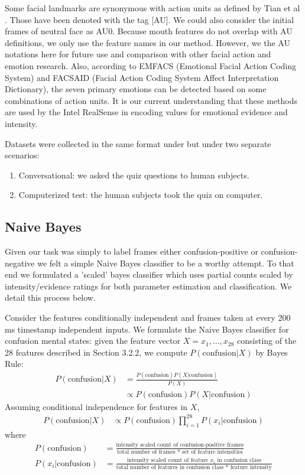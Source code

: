 \documentclass[12pt,letterpaper]{article}
\begin{document}
Some facial landmarks are synonymous with action units as defined by Tian et al \cite{tian2001recognizing}. Those have been denoted with the tag [AU]. We could also consider the initial frames of neutral face as AU0. Because mouth features do not overlap with AU definitions, we only use the feature names in our method. However, we the AU notations here for future use and comparison with other facial action and emotion research.  Also, according to EMFACS (Emotional Facial Action Coding System) and FACSAID (Facial Action Coding System Affect Interpretation Dictionary), the seven primary emotions can be detected based on some combinations of action units.  It is our current understanding that these methods are used by the Intel RealSense in encoding values for emotional evidence and intensity.

Datasets were collected in the same format under but under two separate scenarios: 
\begin{enumerate}
\item Conversational: we asked the quiz questions to human subjects.
\item Computerized test: the human subjects took the quiz on computer.
\end{enumerate}

\subsection{Naive Bayes}
Given our task was simply to label frames either confusion-positive or confusion-negative we felt a simple Naive Bayes classifier to be a worthy attempt.  To that end we formulated a 'scaled' bayes classifier which uses partial counts scaled by intensity/evidence ratings for both parameter estimation and classification.  We detail this process below.

Consider the features conditionally independent and frames taken at every 200 ms timestamp independent inputs. We formulate the Naive Bayes classifier for confusion mental states: given the feature vector $X = {x_1, ... , x_{28}}$ consisting of the 28 features described in Section 3.2.2, we compute $P(\text{confusion}|X)$ by Bayes Rule:
\begin{align}
P(\text{confusion}|X) &= \frac{P(\text{confusion}) P(X|\text{confusion}) }{P(X)} \\
&\propto P(\text{confusion}) P(X|\text{confusion})
\end{align}
Assuming conditional independence for features in $X$, 
\begin{align}
P(\text{confusion}|X) &\propto P(\text{confusion}) \prod_{i=1}^{28} P(x_i | \text{confusion})
\end{align}
where
\begin{align}
P(\text{confusion}) &= \frac{ \text{intensity scaled count of confusion-positive frames} }{ \text{total number of frames * set of feature intensities} } \\
P(x_i|\text{confusion}) &= \frac{ \text{intensity scaled count of feature $x_i$ in confusion class} }{ \text{total number of features in confusion class * feature intensity} } 
\end{align}
\end{document}
